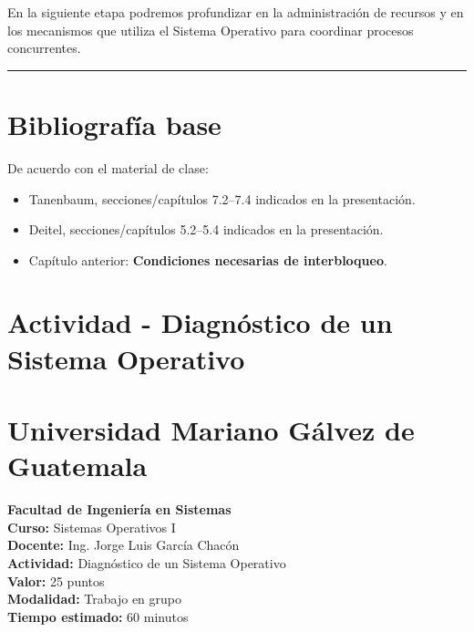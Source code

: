 \documentclass[
  spanish,
  letterpaper,
]{scrbook}
\providecommand{\tightlist}{%
  \setlength{\itemsep}{0pt}\setlength{\parskip}{0pt}}
\begin{document}
En la siguiente etapa podremos profundizar en la administración de
recursos y en los mecanismos que utiliza el Sistema Operativo para
coordinar procesos concurrentes.

\begin{center}\rule{0.5\linewidth}{0.5pt}\end{center}


\chapter{Bibliografía base}\label{bibliografuxeda-base-1}

De acuerdo con el material de clase:

\begin{itemize}
\tightlist
\item
  Tanenbaum, secciones/capítulos 7.2--7.4 indicados en la presentación.
\item
  Deitel, secciones/capítulos 5.2--5.4 indicados en la presentación.
\item
  Capítulo anterior: \textbf{Condiciones necesarias de interbloqueo}.
\end{itemize}


\chapter{Actividad - Diagnóstico de un Sistema
Operativo}\label{actividad---diagnuxf3stico-de-un-sistema-operativo}

\thispagestyle{empty}


\chapter{Universidad Mariano Gálvez de
Guatemala}\label{universidad-mariano-guxe1lvez-de-guatemala}

\textbf{Facultad de Ingeniería en Sistemas}\\
\textbf{Curso:} Sistemas Operativos I\\
\textbf{Docente:} Ing. Jorge Luis García Chacón\\
\textbf{Actividad:} Diagnóstico de un Sistema Operativo\\
\textbf{Valor:} 25 puntos\\
\textbf{Modalidad:} Trabajo en grupo\\
\textbf{Tiempo estimado:} 60 minutos
\end{document}
